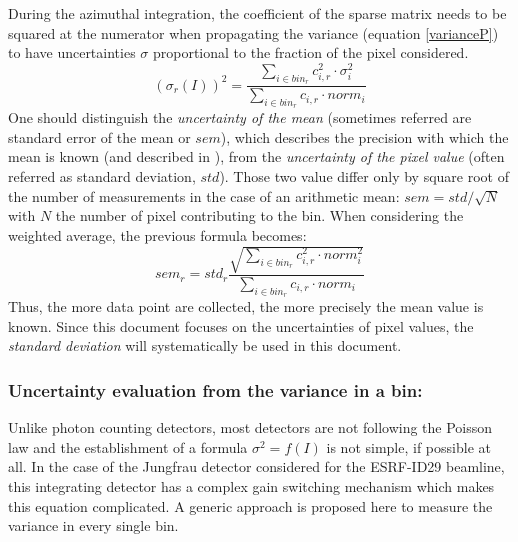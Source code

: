 \documentclass[a4paper,12pt,oneside]{article}              %
\newcommand{\citeasnoun}{\citet}
\begin{document}
During the azimuthal integration, the coefficient of the sparse matrix needs to be squared at the numerator when propagating the variance (equation \ref{varianceP}) to have uncertainties $\sigma$ proportional to the fraction of the pixel considered.
\begin{equation}
\label{varianceP}
(\sigma_{r}(I))^2 = \frac{\sum\limits_{i \in bin_r} c_{i,r}^2 \cdot \sigma_i^2}
                  {\sum\limits_{i \in bin_r} c_{i,r} \cdot norm_i} 
\end{equation}
One should distinguish the \textit{uncertainty of the mean} (sometimes referred are standard error of the mean or $sem$), 
which describes the precision with which the mean is known (and described in \citeasnoun{pyfai_2020}),
from the \textit{uncertainty of the pixel value} (often referred as standard deviation, $std$). 
Those two value differ only by square root of the number of measurements in the case of an arithmetic mean: $sem = std/\sqrt{N}$ with $N$ the number of pixel contributing to the bin.
When considering the weighted average, the previous formula becomes:
\begin{equation}
\label{sem}
sem_r = std_r \frac{\sqrt{\sum\limits_{i \in bin_r} c_{i,r}^2 \cdot norm_i^2}}{\sum\limits_{i \in bin_r} c_{i,r} \cdot norm_i}
\end{equation}
Thus, the more data point are collected, the more precisely the mean value is known.
Since this document focuses on the uncertainties of pixel values, the \textit{standard deviation} will systematically be used in this document.  

\subsubsection{Uncertainty evaluation from the variance in a bin:}

Unlike photon counting detectors, most detectors are not following the Poisson law and the establishment of a formula $\sigma^2 = f(I)$ is not simple, if possible at all. 
In the case of the Jungfrau detector considered for the ESRF-ID29 beamline, this integrating detector has a complex gain switching mechanism \cite{jungfrau_PSI} which makes this equation complicated.
A generic approach is proposed here to measure the variance in every single bin.
\end{document}
